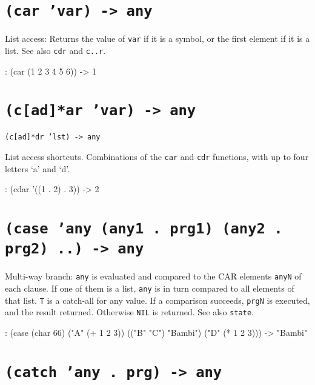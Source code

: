  
\section*{\texttt{(car 'var) -> any}}
\label{sec:funct-rec-C-(car-'var)-->-any}


List access: Returns the value of \texttt{var} if it is a symbol, or the first
element if it is a list. See also \texttt{cdr} and \texttt{c..r}.


\begin{wideverbatim}
: (car (1 2 3 4 5 6))
-> 1
\end{wideverbatim}

 
\section*{\texttt{(c[ad]*ar 'var) -> any}}
\label{sec:funct-rec-C-(c[ad]*ar-'var)-->-any}


\texttt{(c[ad]*dr 'lst) -> any}

List access shortcuts. Combinations of the \texttt{car} and \texttt{cdr} functions,
with up to four letters `a' and `d'.


\begin{wideverbatim}
: (cdar '((1 . 2) . 3))
-> 2
\end{wideverbatim}

 
\section*{\texttt{(case 'any (any1 . prg1) (any2 . prg2) ..) -> any}}
\label{sec:funct-rec-C-(case-'any-(any1-.-prg1)-(any2-.-prg2)-..)-->-any}


Multi-way branch: \texttt{any} is evaluated and compared to the CAR elements
\texttt{anyN} of each clause. If one of them is a list, \texttt{any} is in turn
compared to all elements of that list. \texttt{T} is a catch-all for any value.
If a comparison succeeds, \texttt{prgN} is executed, and the result returned.
Otherwise \texttt{NIL} is returned. See also \texttt{state}.


\begin{wideverbatim}
: (case (char 66) ("A" (+ 1 2 3)) (("B" "C") "Bambi") ("D" (* 1 2 3)))
-> "Bambi"
\end{wideverbatim}

 
\section*{\texttt{(catch 'any . prg) -> any}}
\label{sec:funct-rec-C-(catch-'any-.-prg)-->-any}


